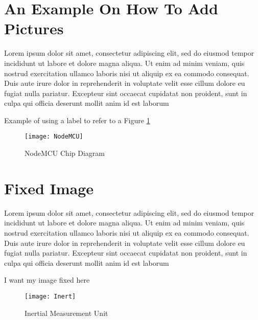 \section{An Example On How To Add Pictures}
Lorem ipsum dolor sit amet, consectetur adipiscing elit, sed do eiusmod tempor incididunt ut labore et dolore magna aliqua. Ut enim ad minim veniam, quis nostrud exercitation ullamco laboris nisi ut aliquip ex ea commodo consequat. Duis aute irure dolor in reprehenderit in voluptate velit esse cillum dolore eu fugiat nulla pariatur. Excepteur sint occaecat cupidatat non proident, sunt in culpa qui officia deserunt mollit anim id est laborum

Example of using a label to refer to a Figure \ref{fig:NodeMCU}

\begin{figure}
    \centering
    \texttt{[image: NodeMCU]}
    \caption{NodeMCU Chip Diagram}
    \label{fig:NodeMCU}
\end{figure}


\section{Fixed Image}Lorem ipsum dolor sit amet, consectetur adipiscing elit, sed do eiusmod tempor incididunt ut labore et dolore magna aliqua. Ut enim ad minim veniam, quis nostrud exercitation ullamco laboris nisi ut aliquip ex ea commodo consequat. Duis aute irure dolor in reprehenderit in voluptate velit esse cillum dolore eu fugiat nulla pariatur. Excepteur sint occaecat cupidatat non proident, sunt in culpa qui officia deserunt mollit anim id est laborum 


I want my image fixed here
\begin{figure}[H]
    \centering
    \texttt{[image: Inert]}
    \caption{Inertial Measurement Unit}
    \label{fig:IMU}
\end{figure}

